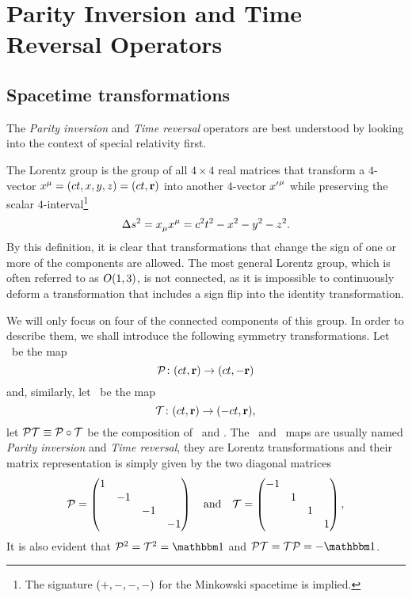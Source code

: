\chapter{Parity Inversion and Time Reversal Operators}\label{ch:pt-operators}
    \section{Spacetime transformations}\label{s:spacetime-transformations}
        The \emph{Parity inversion} and \emph{Time reversal} operators are best understood by looking into the context of special relativity first.

        The Lorentz group is the group of all $4\times4$ real matrices that transform a $4$-vector $\tensor{x}{^\mu} = \pqty{ct,x,y,z} = \pqty{ct,\vb{r}}$ into another $4$-vector $\tensor{{x'}}{^\mu}$ while preserving the scalar $4$-interval\footnote{The signature $\pqty{+,-,-,-}$ for the Minkowski spacetime is implied.}
        \begin{equation}
            \label{eq:4-interval}
            \Delta s^2
            = \tensor{x}{_\mu} \tensor{x}{^\mu}
            = c^2t^2 - x^2 - y^2 - z^2
            \myperiod
        \end{equation}
        By this definition, it is clear that transformations that change the sign of one or more of the components are allowed. The most general Lorentz group, which is often referred to as $O\pqty{1,3}$, is not connected, as it is impossible to continuously deform a transformation that includes a sign flip into the identity transformation.

        We will only focus on four of the connected components of this group. In order to describe them, we shall introduce the following symmetry transformations. Let \mcP\ be the map 
        \begin{equation}
            \label{eq:lorentz-P}
            \func{\mcP}{\pqty{ct,\vb{r}}}{\pqty{ct,-\vb{r}}}
        \end{equation}
        and, similarly, let \mcT\ be the map
        \begin{equation}
            \label{eq:lorentz-T}
            \func{\mcT}{\pqty{ct,\vb{r}}}{\pqty{-ct,\vb{r}}}
            \mycomma
        \end{equation}
        let $\mathcal{P}\mathcal{T} \equiv \mathcal{P}\circ\mathcal{T}$ be the composition of \mcP\ and \mcT.
        The \mcP\ and \mcT\ maps are usually named \emph{Parity inversion} and \emph{Time reversal}, they are Lorentz transformations and their matrix representation is simply given by the two diagonal matrices
        \begin{equation*}
            \mcP = \pmqty{\dmat{1,-1,-1,-1}}
            \qand
            \mcT = \pmqty{\dmat{-1,1,1,1}}
            \mycomma
        \end{equation*}
        It is also evident that $\mcP^2 = \mcT^2 = \idM$ and $\PT = \mcT\mcP = -\idM$.
        
